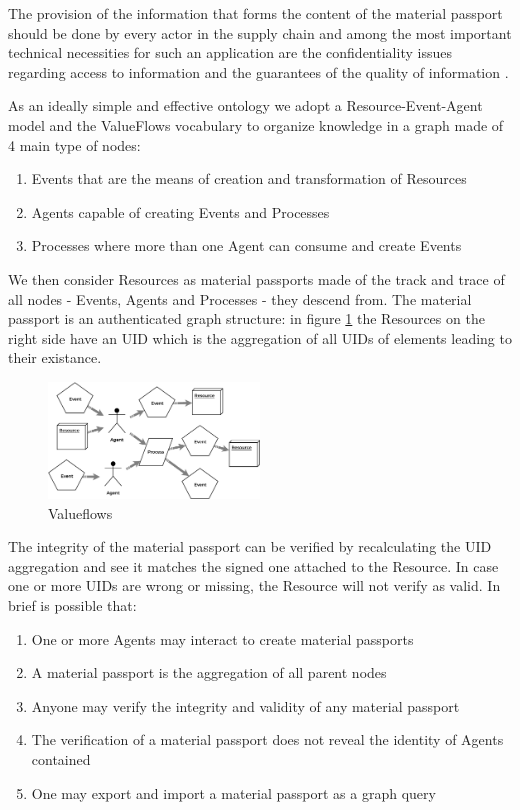 \documentclass[twocolumn]{article}
\begin{document}
The provision of the information that forms the content of the material
passport should be done by every actor in the supply chain and among the
most important technical necessities for such an application are the
confidentiality issues regarding access to information and the
guarantees of the quality of information \citep{resources-passport}.

As an ideally simple and effective ontology we adopt a
Resource-Event-Agent model \citep{REA} and the ValueFlows vocabulary
\citep{valueflows} to organize knowledge in a graph made of 4 main
type of nodes:

\begin{enumerate}
  \item Events that are the means of creation and transformation of Resources
  \item Agents capable of creating Events and Processes
  \item Processes where more than one Agent can consume and create Events
\end{enumerate}

We then consider Resources as material passports made of the track and
trace of all nodes - Events, Agents and Processes - they descend from.
The  material passport is an authenticated graph structure: in figure
\ref{fig:valueflows} the Resources on the right side have an UID which
is the aggregation of all UIDs of elements leading to their existance.

\begin{figure}
  \caption{Valueflows}
  \label{fig:valueflows}
  \centering
  \includegraphics[width=0.5\textwidth]{valueflows.eps}
\end{figure}

The integrity of the material passport can be verified by recalculating
the UID aggregation and see it matches the signed one attached to the
Resource. In case one or more UIDs are wrong or missing, the Resource
will not verify as valid. In brief is possible that:

\begin{enumerate}
  \item One or more Agents may interact to create material passports
  \item A material passport is the aggregation of all parent nodes
  \item Anyone may verify the integrity and validity of any material passport
  \item The verification of a material passport does not reveal the identity of Agents contained
  \item One may export and import a material passport as a graph query
\end{enumerate}
\end{document}
